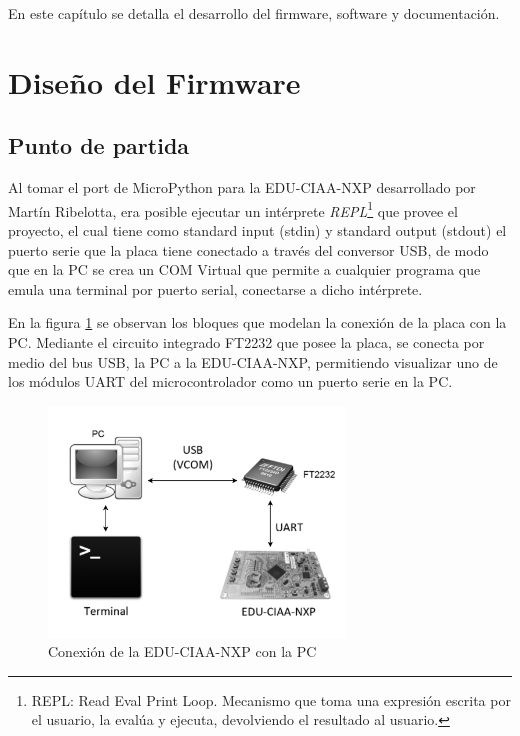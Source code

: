 En este capítulo se detalla el desarrollo del firmware, software y documentación.

\section{Diseño del Firmware}

\subsection{Punto de partida} 

Al tomar el port de MicroPython para la EDU-CIAA-NXP desarrollado por Martín Ribelotta, era posible ejecutar un intérprete \textit{REPL}\footnote{REPL: Read Eval Print Loop. Mecanismo que toma una expresión escrita por el usuario, la evalúa y ejecuta, devolviendo el resultado al usuario.} que provee el proyecto, el cual tiene como standard input (stdin) y standard output (stdout) el puerto serie que la placa tiene conectado a través del conversor USB, de modo que en la PC se crea un COM Virtual que permite a cualquier programa que emula una terminal por puerto serial, conectarse a dicho intérprete.

En la figura \ref{fig:conexion} se observan los bloques que modelan la conexión de la placa con la PC. Mediante el circuito integrado FT2232 que posee la placa, se conecta por medio del bus USB, la PC a la EDU-CIAA-NXP, permitiendo visualizar uno de los módulos UART del microcontrolador como un puerto serie en la PC.

\begin{figure}[h]
  \centering
    \includegraphics[width=0.7\textwidth]{Figures/fig_conexion}
  \caption{Conexión de la EDU-CIAA-NXP con la PC}
  \label{fig:conexion}
\end{figure}


